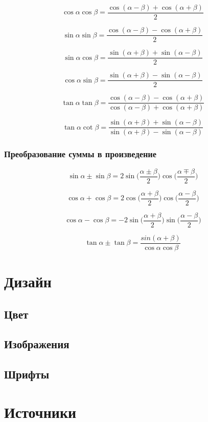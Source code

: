 \documentclass[
  letterpaper,
]{scrbook}
\theoremstyle{definition}
\theoremstyle{remark}
\begin{document}
\[
\cos \alpha \cos \beta = \frac{\cos (\alpha - \beta) + \cos (\alpha + \beta)}{2}
\]

\[
\sin \alpha \sin \beta = \frac{\cos (\alpha - \beta) - \cos (\alpha + \beta)}{2}
\]

\[
\sin \alpha \cos \beta = \frac{\sin (\alpha + \beta) + \sin (\alpha - \beta)}{2}
\]

\[
\cos \alpha \sin \beta = \frac{\sin (\alpha + \beta) - \sin (\alpha - \beta)}{2}
\]

\[
\tan \alpha \tan \beta = \frac{\cos (\alpha - \beta) - \cos (\alpha + \beta)}{\cos (\alpha - \beta) + \cos (\alpha + \beta)}
\]

\[
\tan \alpha \cot \beta = \frac{\sin (\alpha + \beta) + \sin (\alpha - \beta)}{\sin (\alpha + \beta) - \sin (\alpha - \beta)}
\]

\subsection{Преобразование суммы в произведение}\label{trig_sum_to_prod}

\[
\sin \alpha \pm \sin \beta = 2 \sin \Big(\frac{\alpha \pm \beta}{2}\Big) \cos \Big(\frac{\alpha \mp \beta}{2}\Big)
\]

\[
\cos \alpha + \cos \beta = 2 \cos \Big(\frac{\alpha + \beta}{2}\Big) \cos \Big(\frac{\alpha - \beta}{2}\Big)
\]

\[
\cos \alpha - \cos \beta = -2 \sin \Big(\frac{\alpha + \beta}{2}\Big) \sin \Big(\frac{\alpha - \beta}{2}\Big)
\]

\[
\tan \alpha \pm \tan \beta = \frac{sin(\alpha + \beta)}{\cos \alpha \cos \beta}
\]


\chapter{Дизайн}\label{ux434ux438ux437ux430ux439ux43d}

\section{Цвет}\label{ux446ux432ux435ux442}

\section{Изображения}\label{ux438ux437ux43eux431ux440ux430ux436ux435ux43dux438ux44f}

\section{Шрифты}\label{ux448ux440ux438ux444ux442ux44b}


\chapter*{Источники}\label{ux438ux441ux442ux43eux447ux43dux438ux43aux438}


\printbibliography[heading=none]


\backmatter
\end{document}
